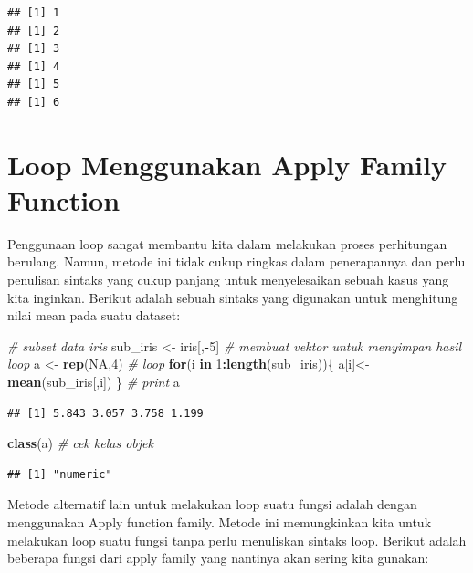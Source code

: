 \documentclass[]{book}
\newenvironment{Shaded}{\begin{snugshade}}{\end{snugshade}}
\newcommand{\CommentTok}[1]{\textcolor[rgb]{0.56,0.35,0.01}{\textit{#1}}}
\newcommand{\ControlFlowTok}[1]{\textcolor[rgb]{0.13,0.29,0.53}{\textbf{#1}}}
\newcommand{\DecValTok}[1]{\textcolor[rgb]{0.00,0.00,0.81}{#1}}
\newcommand{\KeywordTok}[1]{\textcolor[rgb]{0.13,0.29,0.53}{\textbf{#1}}}
\newcommand{\NormalTok}[1]{#1}
\newcommand{\OperatorTok}[1]{\textcolor[rgb]{0.81,0.36,0.00}{\textbf{#1}}}
\newcommand{\OtherTok}[1]{\textcolor[rgb]{0.56,0.35,0.01}{#1}}
\newcommand{\StringTok}[1]{\textcolor[rgb]{0.31,0.60,0.02}{#1}}
\theoremstyle{definition}
\theoremstyle{definition}
\theoremstyle{definition}
\theoremstyle{remark}
\begin{document}
\begin{verbatim}
## [1] 1
## [1] 2
## [1] 3
## [1] 4
## [1] 5
## [1] 6
\end{verbatim}

\hypertarget{loopapply}{%
\section{Loop Menggunakan Apply Family Function}\label{loopapply}}

Penggunaan loop sangat membantu kita dalam melakukan proses perhitungan berulang. Namun, metode ini tidak cukup ringkas dalam penerapannya dan perlu penulisan sintaks yang cukup panjang untuk menyelesaikan sebuah kasus yang kita inginkan. Berikut adalah sebuah sintaks yang digunakan untuk menghitung nilai mean pada suatu dataset:

\begin{Shaded}
\begin{Highlighting}[]
\CommentTok{# subset data iris}
\NormalTok{sub_iris <-}\StringTok{ }\NormalTok{iris[,}\OperatorTok{-}\DecValTok{5}\NormalTok{]}
\CommentTok{# membuat vektor untuk menyimpan hasil loop}
\NormalTok{a <-}\StringTok{ }\KeywordTok{rep}\NormalTok{(}\OtherTok{NA}\NormalTok{,}\DecValTok{4}\NormalTok{)}
\CommentTok{# loop}
\ControlFlowTok{for}\NormalTok{(i }\ControlFlowTok{in} \DecValTok{1}\OperatorTok{:}\KeywordTok{length}\NormalTok{(sub_iris))\{}
\NormalTok{  a[i]<-}\KeywordTok{mean}\NormalTok{(sub_iris[,i])}
\NormalTok{\}}
\CommentTok{# print}
\NormalTok{a}
\end{Highlighting}
\end{Shaded}

\begin{verbatim}
## [1] 5.843 3.057 3.758 1.199
\end{verbatim}

\begin{Shaded}
\begin{Highlighting}[]
\KeywordTok{class}\NormalTok{(a) }\CommentTok{# cek kelas objek}
\end{Highlighting}
\end{Shaded}

\begin{verbatim}
## [1] "numeric"
\end{verbatim}

Metode alternatif lain untuk melakukan loop suatu fungsi adalah dengan menggunakan Apply function family. Metode ini memungkinkan kita untuk melakukan loop suatu fungsi tanpa perlu menuliskan sintaks loop. Berikut adalah beberapa fungsi dari apply family yang nantinya akan sering kita gunakan:
\end{document}
